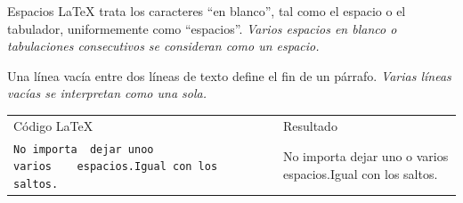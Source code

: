 \documentclass[10pt, xcolor=table]{beamer}
\begin{document}
\begin{frame}{Espacios}
	\LaTeX{} trata los caracteres ``en blanco'', tal como el espacio o el tabulador, uniformemente como ``espacios''. \emph{Varios espacios en blanco o tabulaciones consecutivos se consideran como un espacio.}
	
	Una línea vacía entre dos líneas de texto define el fin de un párrafo. \emph{Varias líneas vacías se interpretan como una sola.}
	
	\begin{table}[H]
		\begin{tabular}{ L{4cm} L{0.5cm} L{4cm} }
			\alert{Código \LaTeX{}}                                                                                                                             & \hspace{1cm} & \alert{Resultado}                                                                                 \\
			\texttt{No importa\ \ dejar uno}\newline\texttt{o varios\ \ \ \ espacios.}\newline[0.5cm] \texttt{Igual con los saltos.} &              & No importa dejar uno o varios espacios.\newline Igual con los saltos. \\
		\end{tabular}
	\end{table}
	
\end{frame}
\end{document}
